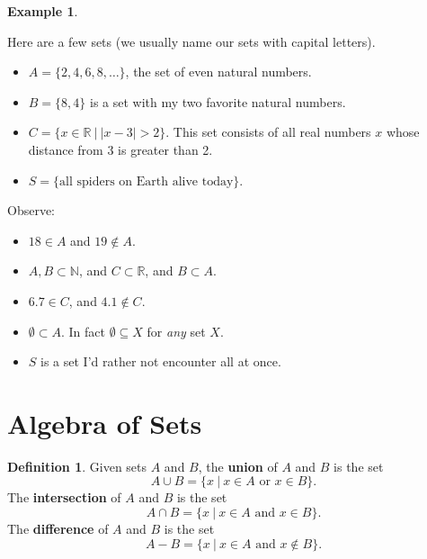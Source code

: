 \documentclass[
]{book}
\providecommand{\tightlist}{%
  \setlength{\itemsep}{0pt}\setlength{\parskip}{0pt}}
\theoremstyle{definition}
\newtheorem{definition}{Definition}[chapter]
\theoremstyle{definition}
\newtheorem{example}{Example}[chapter]
\theoremstyle{definition}
\theoremstyle{definition}
\theoremstyle{remark}
\begin{document}
\begin{example}
\protect\hypertarget{exm:first-sets}{}\label{exm:first-sets}

Here are a few sets (we usually name our sets with capital letters).

\begin{itemize}
\tightlist
\item
  \(A = \{2, 4, 6, 8, \ldots\}\), the set of even natural numbers.
\item
  \(B = \{8,4\}\) is a set with my two favorite natural numbers.
\item
  \(C = \{ x \in \mathbb{R} ~|~ |x-3| > 2 \}.\) This set consists of all real numbers \(x\) whose distance from 3 is greater than 2.
\item
  \(S = \{\text{all spiders on Earth alive today}\}\).
\end{itemize}

Observe:

\begin{itemize}
\tightlist
\item
  \(18 \in A\) and \(19 \notin A\).
\item
  \(A,B \subset \mathbb{N}\), and \(C \subset \mathbb{R}\), and \(B \subset A\).
\item
  \(6.7 \in C\), and \(4.1 \notin C\).
\item
  \(\emptyset \subset A\). In fact \(\emptyset \subseteq X\) for \emph{any} set \(X\).
\item
  \(S\) is a set I'd rather not encounter all at once.
\end{itemize}

\end{example}

\section{Algebra of Sets}\label{algebra-of-sets}

\begin{definition}
\protect\hypertarget{def:set-algebra}{}\label{def:set-algebra}Given sets \(A\) and \(B\), the \textbf{union} of \(A\) and \(B\) is the set \[A \cup B = \{x ~|~ x \in A \text{ or } x \in B\}.\]
The \textbf{intersection} of \(A\) and \(B\) is the set \[A \cap B = \{x ~|~ x \in A \text{ and } x \in B \}.\]
The \textbf{difference} of \(A\) and \(B\) is the set
\[A − B = \{x ~|~ x \in A \text{ and } x \notin B\}.\]
\end{definition}
\end{document}
